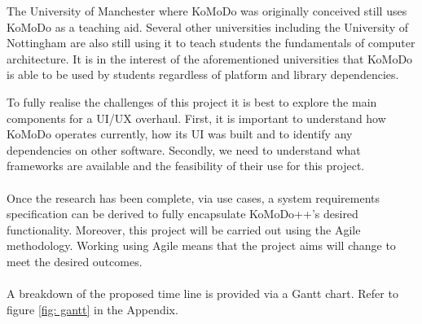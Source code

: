The University of Manchester where KoMoDo was originally conceived still uses KoMoDo as a teaching aid. Several other universities including the University of Nottingham are also still using it to teach students the fundamentals of computer architecture. It is in the interest of the aforementioned universities that KoMoDo is able to be used by students regardless of platform and library dependencies.

To fully realise the challenges of this project it is best to explore the main components for a UI/UX overhaul. First, it is important to understand how KoMoDo operates currently, how its UI was built and to identify any dependencies on other software. Secondly, we need to understand what frameworks are available and the feasibility of their use for this project. \\\\
%
Once the research has been complete, via use cases, a system requirements specification can be derived to fully encapsulate KoMoDo++'s desired functionality. Moreover, this project will be carried out using the Agile methodology. Working using Agile means that the project aims will change to meet the desired outcomes.\\\\
%
A breakdown of the proposed time line is provided via a Gantt chart. Refer to figure \ref{fig: gantt} in the Appendix.

